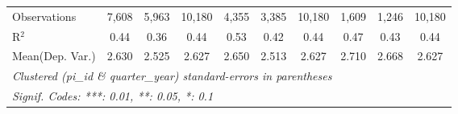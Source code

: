 \begin{tabular}{lccccccccc}
   Observations                                                & 7,608        & 5,963         & 10,180        & 4,355       & 3,385        & 10,180        & 1,609     & 1,246   & 10,180\\  
   R$^2$                                                       & 0.44         & 0.36          & 0.44          & 0.53        & 0.42         & 0.44          & 0.47      & 0.43    & 0.44\\  
Mean(Dep. Var.) & 2.630 & 2.525 & 2.627 & 2.650 & 2.513 & 2.627 & 2.710 & 2.668 & 2.627 \\
   \midrule \midrule
   \multicolumn{10}{l}{\emph{Clustered (pi\_id \& quarter\_year) standard-errors in parentheses}}\\
   \multicolumn{10}{l}{\emph{Signif. Codes: ***: 0.01, **: 0.05, *: 0.1}}\\
\end{tabular}
\par\endgroup
